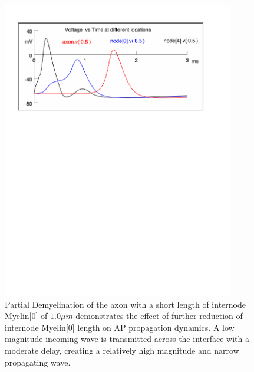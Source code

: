 \documentclass[12pt]{article}
\begin{document}
\begin{figure}[H]
\centering
\includegraphics[width=0.9\textwidth]{Results/4c-1}
\caption{\label{fig:P4c2} Partial Demyelination of the axon with a short length of internode Myelin[0] of $1.0 \mu m$ demonstrates the effect of further reduction of internode Myelin[0] length on AP propagation dynamics. A low magnitude incoming wave is transmitted across the interface with a moderate delay, creating a relatively high magnitude and narrow propagating wave.}
\end{figure}
\end{document}
